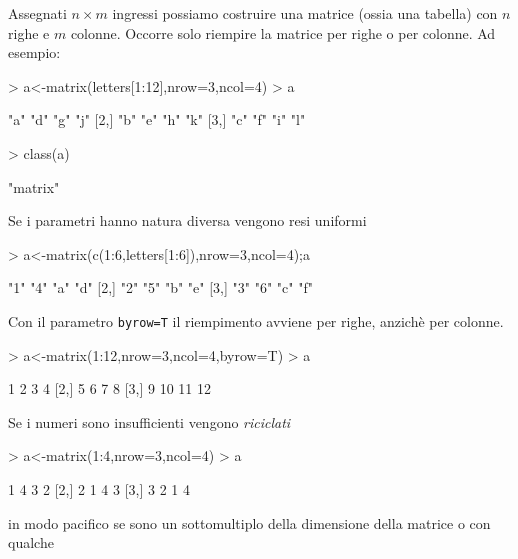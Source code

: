\documentclass[onecolumn,11pt]{book}
\begin{document}
Assegnati $n\times m$ ingressi possiamo costruire una matrice (ossia una tabella) con $n$ righe e $m$ colonne. Occorre solo riempire la matrice per righe o per colonne.
Ad esempio:
\begin{Schunk}
\begin{Sinput}
> a<-matrix(letters[1:12],nrow=3,ncol=4)
> a
\end{Sinput}
\begin{Soutput}
     [,1] [,2] [,3] [,4]
[1,] "a"  "d"  "g"  "j" 
[2,] "b"  "e"  "h"  "k" 
[3,] "c"  "f"  "i"  "l" 
\end{Soutput}
\begin{Sinput}
> class(a)
\end{Sinput}
\begin{Soutput}
[1] "matrix"
\end{Soutput}
\end{Schunk}
Se i parametri hanno natura diversa vengono resi uniformi
\begin{Schunk}
\begin{Sinput}
> a<-matrix(c(1:6,letters[1:6]),nrow=3,ncol=4);a
\end{Sinput}
\begin{Soutput}
     [,1] [,2] [,3] [,4]
[1,] "1"  "4"  "a"  "d" 
[2,] "2"  "5"  "b"  "e" 
[3,] "3"  "6"  "c"  "f" 
\end{Soutput}
\end{Schunk}
Con il parametro \texttt{byrow=T} il riempimento avviene per righe, anzich\`e per colonne.
\begin{Schunk}
\begin{Sinput}
>  a<-matrix(1:12,nrow=3,ncol=4,byrow=T)
>  a
\end{Sinput}
\begin{Soutput}
     [,1] [,2] [,3] [,4]
[1,]    1    2    3    4
[2,]    5    6    7    8
[3,]    9   10   11   12
\end{Soutput}
\end{Schunk}
Se i numeri sono insufficienti vengono \emph {riciclati}
\begin{Schunk}
\begin{Sinput}
> a<-matrix(1:4,nrow=3,ncol=4)
> a
\end{Sinput}
\begin{Soutput}
     [,1] [,2] [,3] [,4]
[1,]    1    4    3    2
[2,]    2    1    4    3
[3,]    3    2    1    4
\end{Soutput}
\end{Schunk}
in modo pacifico se sono un sottomultiplo della dimensione della matrice o con qualche
\end{document}

